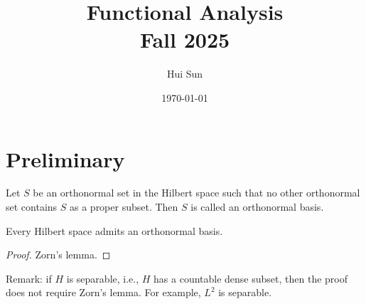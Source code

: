 \documentclass[openany]{book}
\title{Functional Analysis
\\ 
\vspace{0.4cm}
\large Fall 2025}
\date{\today}
\author{Hui Sun}
\begin{document}
\maketitle

\chapter{Preliminary}


\begin{defn}
    Let $S$ be an orthonormal set in the Hilbert space such that no other orthonormal set contains $S$ as a proper subset. Then $S$ is called an orthonormal basis.
\end{defn}

\begin{prop}
    Every Hilbert space admits an orthonormal basis.
\end{prop}
\begin{proof}
    Zorn's lemma.
\end{proof}
Remark: if $H$ is separable, i.e., $H$ has a countable dense subset, then the proof does not require Zorn's lemma. For example, $L^2$ is separable.
\end{document}

